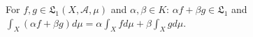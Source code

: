 For $f, g \in \mathfrak{L}_1(X, \mathcal{A}, \mu)$ and $\alpha, \beta \in K$: $\alpha f + \beta g \in \mathfrak{L}_1$ and $\int_X (\alpha f + \beta g) d\mu = \alpha \int_X f d\mu + \beta \int_X g d\mu$.
